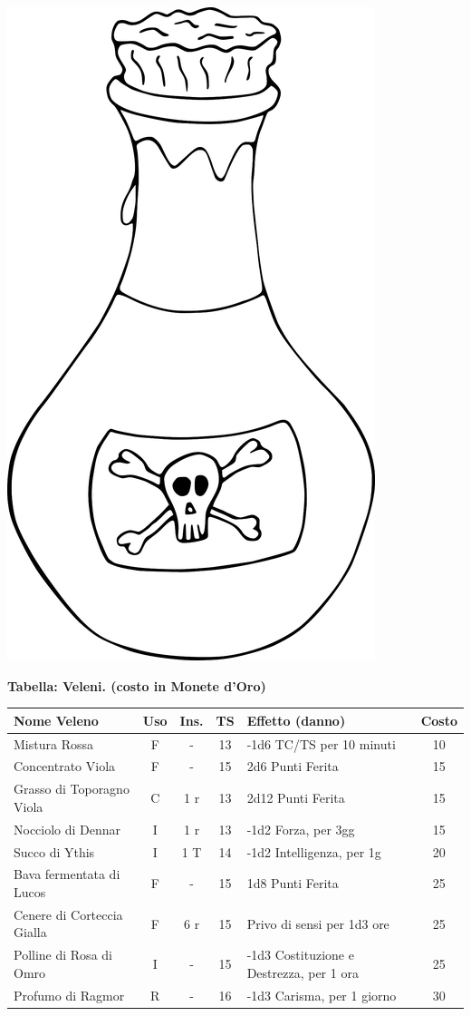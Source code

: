 \vfill

\begin{center}
	\includegraphics[height=0.25\linewidth]{immagini/poison.png}
\end{center}

\textbf{Tabella: Veleni. (costo in Monete d'Oro)}\label{tabellaveleni}

\medskip

	\noindent\begin{tabularx}{\linewidth}{lcccXc}
	\toprule
 \rowcolor{gray!20}\textbf{Nome Veleno} & \textbf{Uso} & \textbf{Ins.} & \textbf{TS} & \textbf{Effetto (danno)} & \textbf{Costo}\\
\toprule
	Mistura Rossa \index{Mistura Rossa} & F& -& 13& -1d6 TC/TS per 10 minuti & 10\\

 \rowcolor{gray!20}Concentrato Viola \index{Concentrato Viola} & F& -& 15& 2d6 Punti Ferita & 15\\

	Grasso di Toporagno Viola \index{Grasso di Toporagno Viola} & C& 1 r& 13& 2d12 Punti Ferita & 15\\

 \rowcolor{gray!20}Nocciolo di Dennar \index{Nocciolo di Dennar}& I& 1 r& 13& -1d2 Forza, per 3gg& 15\\

	Succo di Ythis\index{Succo di Ythis} & I& 1 T& 14& -1d2 Intelligenza, per 1g& 20\\

	Bava fermentata di Lucos \index{Bava fermentata di Lucos}\label{bavadilucos}\hypertarget{bavadilucos}{}& F& - & 15& 1d8 Punti Ferita& 25\\

 \rowcolor{gray!20}Cenere di Corteccia Gialla \index{Cenere di Corteccia Gialla} & F& 6 r& 15& Privo di sensi per 1d3 ore& 25\\

	Polline di Rosa di Omro\index{Polline di Rosa di Omro} & I& - & 15& -1d3 Costituzione e Destrezza, per 1 ora & 25\\

 \rowcolor{gray!20}Profumo di Ragmor \index{Profumo di Ragmor}& R& - & 16& -1d3 Carisma, per 1 giorno & 30\\


\end{tabularx}

